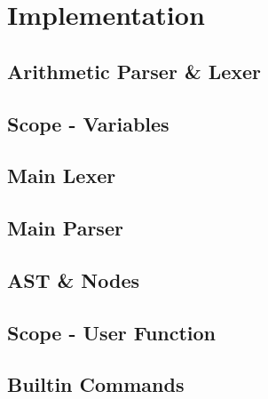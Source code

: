 \chapter{Implementation}




\section{Arithmetic Parser \& Lexer}

\section{Scope - Variables}

\section{Main Lexer}

\section{Main Parser}

\section{AST \& Nodes}

\section{Scope - User Function}

\section{Builtin Commands}

\section{}